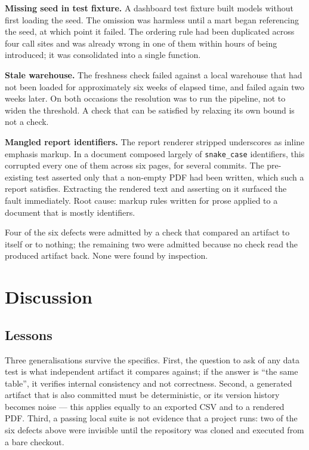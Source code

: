\documentclass[conference]{IEEEtran}
\begin{document}
\textbf{Missing seed in test fixture.} A dashboard test fixture built models
without first loading the seed. The omission was harmless until a mart began
referencing the seed, at which point it failed. The ordering rule had been
duplicated across four call sites and was already wrong in one of them within
hours of being introduced; it was consolidated into a single function.

\textbf{Stale warehouse.} The freshness check failed against a local warehouse
that had not been loaded for approximately six weeks of elapsed time, and
failed again two weeks later. On both occasions the resolution was to run the
pipeline, not to widen the threshold. A check that can be satisfied by relaxing
its own bound is not a check.

\textbf{Mangled report identifiers.} The report renderer stripped underscores
as inline emphasis markup. In a document composed largely of
\texttt{snake\_case} identifiers, this corrupted every one of them across six
pages, for several commits. The pre-existing test asserted only that a non-empty
PDF had been written, which such a report satisfies. Extracting the rendered
text and asserting on it surfaced the fault immediately. Root cause: markup
rules written for prose applied to a document that is mostly identifiers.

Four of the six defects were admitted by a check that compared an artifact to
itself or to nothing; the remaining two were admitted because no check read the
produced artifact back. None were found by inspection.

\section{Discussion}
\label{sec:discussion}

\subsection{Lessons}
Three generalisations survive the specifics. First, the question to ask of any
data test is what independent artifact it compares against; if the answer is
``the same table'', it verifies internal consistency and not correctness.
Second, a generated artifact that is also committed must be deterministic, or
its version history becomes noise --- this applies equally to an exported CSV
and to a rendered PDF. Third, a passing local suite is not evidence that a
project runs: two of the six defects above were invisible until the repository
was cloned and executed from a bare checkout.
\end{document}
